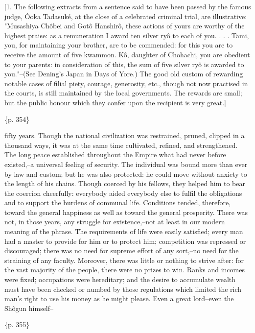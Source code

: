 [1. The following extracts from a sentence said to have been passed by the famous judge, Ôoka Tadasuké, at the close of a celebrated criminal trial, are illustrative: "Musashiya Chôbei and Gotô Hanshirô, these actions of yours are worthy of the highest praise: as a remuneration I award ten silver ryô to each of you. . . . Tami, you, for maintaining your brother, are to be commended: for this you are to receive the amount of five kwammon. Kô, daughter of Chohachi, you are obedient to your parents: in consideration of this, the sum of five silver ryô is awarded to you."--(See Dening's Japan in Days of Yore.) The good old custom of rewarding notable cases of filial piety, courage, generosity, etc., though not now practised in the courts, is still maintained by the local governments. The rewards are small; but the public honour which they confer upon the recipient is very great.]

\{p. 354\}

fifty years. Though the national civilization was restrained, pruned, clipped in a thousand ways, it was at the same time cultivated, refined, and strengthened. The long peace established throughout the Empire what had never before existed,--a universal feeling of security. The individual was bound more than ever by law and custom; but he was also protected: he could move without anxiety to the length of his chains. Though coerced by his fellows, they helped him to bear the coercion cheerfully: everybody aided everybody else to fulfil the obligations and to support the burdens of communal life. Conditions tended, therefore, toward the general happiness as well as toward the general prosperity. There was not, in those years, any struggle for existence,--not at least in our modern meaning of the phrase. The requirements of life were easily satisfied; every man had a master to provide for him or to protect him; competition was repressed or discouraged; there was no need for supreme effort of any sort,--no need for the straining of any faculty. Moreover, there was little or nothing to strive after: for the vast majority of the people, there were no prizes to win. Ranks and incomes were fixed; occupations were hereditary; and the desire to accumulate wealth must have been checked or numbed by those regulations which limited the rich man's right to use his money as he might please. Even a great lord--even the Shôgun himself--

\{p. 355\}

